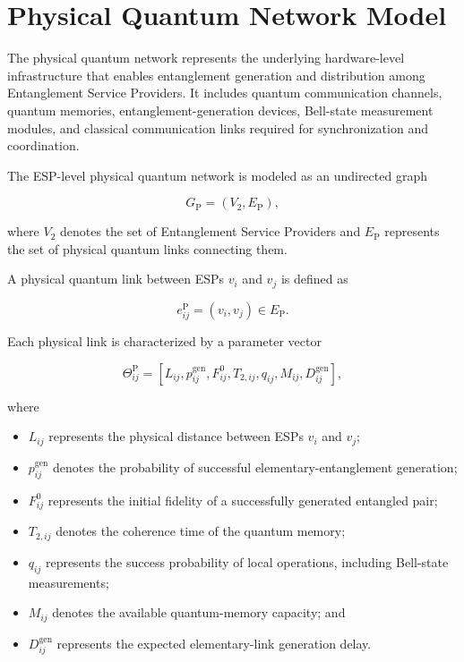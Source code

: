 \section{Physical Quantum Network Model}

The physical quantum network represents the underlying hardware-level infrastructure that enables entanglement generation and distribution among Entanglement Service Providers. It includes quantum communication channels, quantum memories, entanglement-generation devices, Bell-state measurement modules, and classical communication links required for synchronization and coordination.

The ESP-level physical quantum network is modeled as an undirected graph

\begin{equation}
    G_{\mathrm{P}}
    =
    \left(
    V_{2},
    E_{\mathrm{P}}
    \right),
\end{equation}

where $V_{2}$ denotes the set of Entanglement Service Providers and $E_{\mathrm{P}}$ represents the set of physical quantum links connecting them.

A physical quantum link between ESPs $v_i$ and $v_j$ is defined as

\begin{equation}
    e_{ij}^{\mathrm{P}}
    =
    \left(
    v_i,
    v_j
    \right)
    \in
    E_{\mathrm{P}} .
\end{equation}

Each physical link is characterized by a parameter vector

\begin{equation}
    \Theta_{ij}^{\mathrm{P}}
    =
    \left[
    L_{ij},
    p_{ij}^{\mathrm{gen}},
    F_{ij}^{0},
    T_{2,ij},
    q_{ij},
    M_{ij},
    D_{ij}^{\mathrm{gen}}
    \right],
\end{equation}

where

\begin{itemize}
    \item $L_{ij}$ represents the physical distance between ESPs $v_i$ and $v_j$;
    \item $p_{ij}^{\mathrm{gen}}$ denotes the probability of successful elementary-entanglement generation;
    \item $F_{ij}^{0}$ represents the initial fidelity of a successfully generated entangled pair;
    \item $T_{2,ij}$ denotes the coherence time of the quantum memory;
    \item $q_{ij}$ represents the success probability of local operations, including Bell-state measurements;
    \item $M_{ij}$ denotes the available quantum-memory capacity; and
    \item $D_{ij}^{\mathrm{gen}}$ represents the expected elementary-link generation delay.
\end{itemize}

